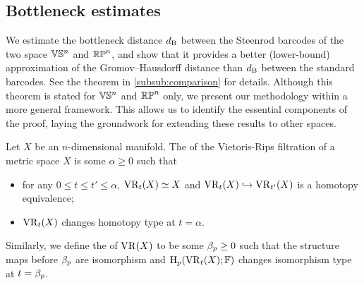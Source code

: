\subsection{Bottleneck estimates}\label{prop:db estimate}

We estimate the bottleneck distance $d_{\mathrm{B}}$ between the Steenrod barcodes of the two space $\mathbb{V}\mathbb{S}^n$ and $\mathbb{RP}^n$, and show that it provides a better (lower-bound) approximation of the Gromov--Hausdorff distance than $d_{\mathrm{B}}$ between the standard barcodes.
See the theorem in \cref{subsub:comparison} for details.
Although this theorem is stated for $\mathbb{V}\mathbb{S}^n$ and $\mathbb{RP}^n$ only, we present our methodology within a more general framework.
This allows us to identify the essential components of the proof, laying the groundwork for extending these results to other spaces.

Let $X$ be an $n$-dimensional manifold.
The  of the Vietoris-Rips filtration of a metric space $X$ is some $\alpha\geq 0$ such that 
\begin{itemize}
    \item for any $0 \leq t\leq t'\leq \alpha$, $\operatorname{VR}_t(X)\simeq X$ and $\operatorname{VR}_{t}(X) \hookrightarrow \operatorname{VR}_{t'}(X)$ is a homotopy equivalence;
    \item $\operatorname{VR}_t(X)$ changes homotopy type at $t=\alpha$.
\end{itemize}
Similarly, we define the  of $\operatorname{VR}(X)$ to be some $\beta_p \geq 0$ such that the structure maps before $\beta_p $ are isomorphism and $\mathrm{H}_p (\operatorname{VR}_t(X); \mathbb{F})$ changes isomorphism type at $t = \beta_p $.

